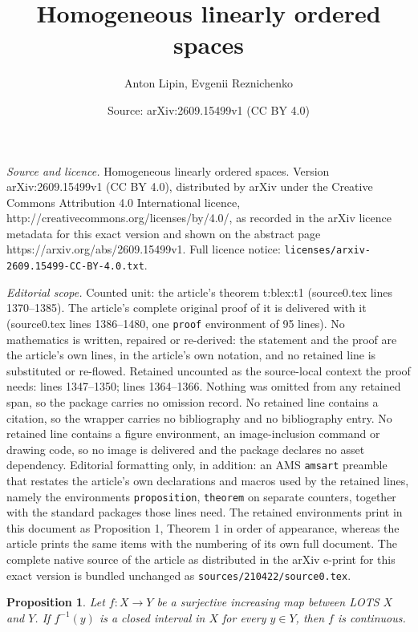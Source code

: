 \documentclass[10pt,a4paper]{amsart}
\title{Homogeneous linearly ordered spaces}
\author{Anton Lipin, Evgenii Reznichenko}
\date{Source: arXiv:2609.15499v1 (CC BY 4.0)}
\newtheorem{proposition}{Proposition}
\begin{document}
\maketitle

\noindent\emph{Source and licence.} Homogeneous linearly ordered spaces. Version arXiv:2609.15499v1 (CC BY 4.0), distributed by arXiv under the Creative Commons Attribution 4.0 International licence, http://creativecommons.org/licenses/by/4.0/, as recorded in the arXiv licence metadata for this exact version and shown on the abstract page https://arxiv.org/abs/2609.15499v1. Full licence notice: \texttt{licenses/arxiv-2609.15499-CC-BY-4.0.txt}.\par\smallskip

\noindent\textit{Editorial scope.} Counted unit: the article's theorem t:blex:t1 (source0.tex lines 1370--1385). The article's complete original proof of it is delivered with it (source0.tex lines 1386--1480, one \texttt{proof} environment of 95 lines). No mathematics is written, repaired or re-derived: the statement and the proof are the article's own lines, in the article's own notation, and no retained line is substituted or re-flowed.  Retained uncounted as the source-local context the proof needs: lines 1347--1350; lines 1364--1366.  Nothing was omitted from any retained span, so the package carries no omission record.  No retained line contains a citation, so the wrapper carries no bibliography and no bibliography entry.  No retained line contains a figure environment, an image-inclusion command or drawing code, so no image is delivered and the package declares no asset dependency.  Editorial formatting only, in addition: an AMS \texttt{amsart} preamble that restates the article's own declarations and macros used by the retained lines, namely the environments \texttt{proposition}, \texttt{theorem} on separate counters, together with the standard packages those lines need.  The retained environments print in this document as Proposition 1, Theorem 1 in order of appearance, whereas the article prints the same items with the numbering of its own full document.  The complete native source of the article as distributed in the arXiv e-print for this exact version is bundled unchanged as \texttt{sources/210422/source0.tex}.
\begin{proposition}\label{p:blex:2-1}
Let $f: X\to Y$ be a surjective increasing map between LOTS $X$ and $Y$.
If $f^{-1}(y)$ is a closed interval in $X$ for every $y\in Y$, then $f$ is continuous.
\end{proposition}
\end{document}
